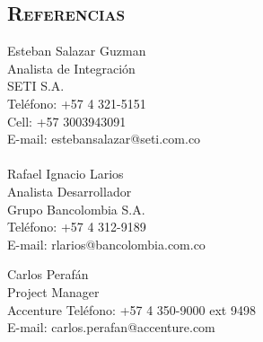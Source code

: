 \begin{resume}
\section{\textsc{Referencias}}

 Esteban Salazar Guzman\\
 Analista de Integraci\'{o}n  \\
 SETI S.A. \\
 Tel\'{e}fono: +57 4 321-5151 \\
 Cell: +57 3003943091 \\ 
 E-mail: estebansalazar@seti.com.co\\
 \\  
 Rafael Ignacio Larios\\
 Analista Desarrollador \\
 Grupo Bancolombia S.A. \\
 Tel\'{e}fono: +57 4 312-9189  \\
 E-mail: rlarios@bancolombia.com.co 

 Carlos Peraf\'{a}n \\
 Project Manager \\
 Accenture
 Tel\'{e}fono: +57 4 350-9000 ext 9498  \\
 E-mail: carlos.perafan@accenture.com 
\end{resume}

